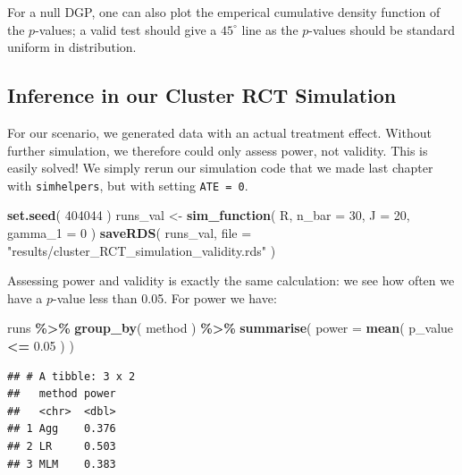 \documentclass[
]{book}
\newenvironment{Shaded}{\begin{snugshade}}{\end{snugshade}}
\newcommand{\AttributeTok}[1]{\textcolor[rgb]{0.13,0.29,0.53}{#1}}
\newcommand{\DecValTok}[1]{\textcolor[rgb]{0.00,0.00,0.81}{#1}}
\newcommand{\FloatTok}[1]{\textcolor[rgb]{0.00,0.00,0.81}{#1}}
\newcommand{\FunctionTok}[1]{\textcolor[rgb]{0.13,0.29,0.53}{\textbf{#1}}}
\newcommand{\NormalTok}[1]{#1}
\newcommand{\OtherTok}[1]{\textcolor[rgb]{0.56,0.35,0.01}{#1}}
\newcommand{\SpecialCharTok}[1]{\textcolor[rgb]{0.81,0.36,0.00}{\textbf{#1}}}
\newcommand{\StringTok}[1]{\textcolor[rgb]{0.31,0.60,0.02}{#1}}
\begin{document}
For a null DGP, one can also plot the emperical cumulative density function of the \(p\)-values; a valid test should give a \(45^\circ\) line as the \(p\)-values should be standard uniform in distribution.

\subsection{Inference in our Cluster RCT Simulation}\label{inference-in-our-cluster-rct-simulation}

For our scenario, we generated data with an actual treatment effect.
Without further simulation, we therefore could only assess power, not validity.
This is easily solved!
We simply rerun our simulation code that we made last chapter with \texttt{simhelpers}, but with setting \texttt{ATE\ =\ 0}.

\begin{Shaded}
\begin{Highlighting}[]
\FunctionTok{set.seed}\NormalTok{( }\DecValTok{404044}\NormalTok{ )}
\NormalTok{runs\_val }\OtherTok{\textless{}{-}} \FunctionTok{sim\_function}\NormalTok{( R, }\AttributeTok{n\_bar =} \DecValTok{30}\NormalTok{, }\AttributeTok{J =} \DecValTok{20}\NormalTok{, }\AttributeTok{gamma\_1 =} \DecValTok{0}\NormalTok{ )}
\FunctionTok{saveRDS}\NormalTok{( runs\_val, }\AttributeTok{file =} \StringTok{"results/cluster\_RCT\_simulation\_validity.rds"}\NormalTok{ )}
\end{Highlighting}
\end{Shaded}

Assessing power and validity is exactly the same calculation: we see how often we have a \(p\)-value less than 0.05.
For power we have:

\begin{Shaded}
\begin{Highlighting}[]
\NormalTok{runs }\SpecialCharTok{\%\textgreater{}\%} \FunctionTok{group\_by}\NormalTok{( method ) }\SpecialCharTok{\%\textgreater{}\%}
  \FunctionTok{summarise}\NormalTok{( }\AttributeTok{power =} \FunctionTok{mean}\NormalTok{( p\_value }\SpecialCharTok{\textless{}=} \FloatTok{0.05}\NormalTok{ ) )}
\end{Highlighting}
\end{Shaded}

\begin{verbatim}
## # A tibble: 3 x 2
##   method power
##   <chr>  <dbl>
## 1 Agg    0.376
## 2 LR     0.503
## 3 MLM    0.383
\end{verbatim}
\end{document}
